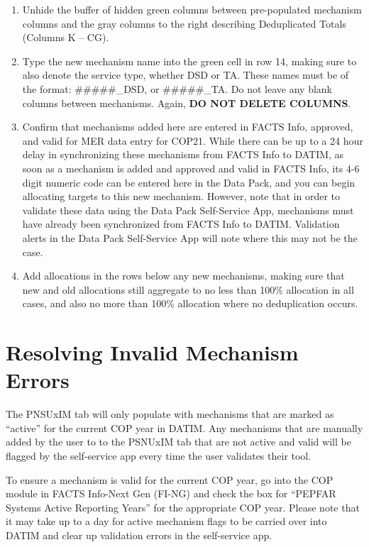 \documentclass[
  openany]{book}
\begin{document}
\begin{enumerate}
  \begin{enumerate}
  \def\labelenumii{\alph{enumii}.}
  \item
    Unhide the buffer of hidden green columns between pre-populated
    mechanism columns and the gray columns to the right describing
    Deduplicated Totals (Columns K -- CG).
  \item
    Type the new mechanism name into the green cell in row 14,
    making sure to also denote the service type, whether DSD or TA.
    These names must be of the format: \#\#\#\#\#\_DSD, or
    \#\#\#\#\#\_TA. Do not leave any blank columns between
    mechanisms. Again, \textbf{DO NOT DELETE COLUMNS}.
  \item
    Confirm that mechanisms added here are entered in FACTS Info,
    approved, and valid for MER data entry for COP21. While there
    can be up to a 24 hour delay in synchronizing these mechanisms
    from FACTS Info to DATIM, as soon as a mechanism is added and
    approved and valid in FACTS Info, its 4-6 digit numeric code can
    be entered here in the Data Pack, and you can begin allocating
    targets to this new mechanism. However, note that in order to
    validate these data using the Data Pack Self-Service App,
    mechanisms must have already been synchronized from FACTS Info
    to DATIM. Validation alerts in the Data Pack Self-Service App
    will note where this may not be the case.
  \item
    Add allocations in the rows below any new mechanisms, making
    sure that new and old allocations still aggregate to no less
    than 100\% allocation in all cases, and also no more than 100\%
    allocation where no deduplication occurs.
  \end{enumerate}
\end{enumerate}

\hypertarget{resolving-invalid-mechanism-errors}{%
\section{Resolving Invalid Mechanism Errors}\label{resolving-invalid-mechanism-errors}}

The PNSUxIM tab will only populate with mechanisms that are marked as
``active'' for the current COP year in DATIM. Any mechanisms that are
manually added by the user to to the PSNUxIM tab that are not active and
valid will be flagged by the self-service app every time the user validates
their tool.

To ensure a mechanism is valid for the current COP year, go into
the COP module in FACTS Info-Next Gen (FI-NG) and check the box for
``PEPFAR Systems Active Reporting Years'' for the appropriate COP year. Please
note that it may take up to a day for active mechanism flags to be carried over
into DATIM and clear up validation errors in the self-service app.
\end{document}
